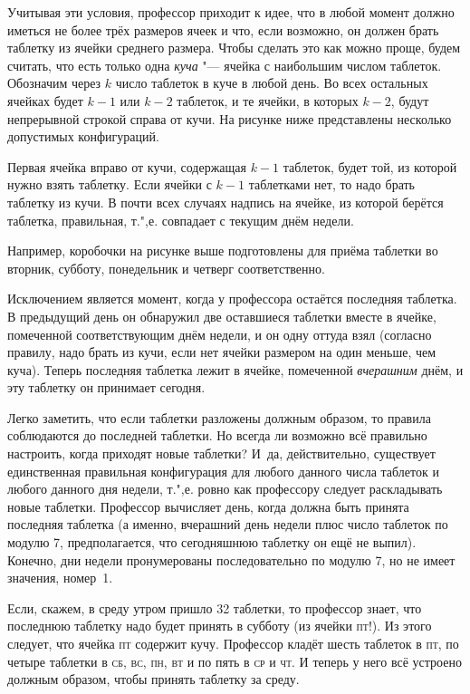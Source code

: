 \documentclass[twoside]{book}
\begin{document}
Учитывая эти условия, профессор приходит к идее, что в любой момент должно иметься не более трёх размеров ячеек и что, если возможно, он должен брать таблетку из ячейки среднего размера.
Чтобы сделать это как можно проще, будем считать, что есть только одна \emph{куча} "--- ячейка с наибольшим числом таблеток.
Обозначим через $k$ число таблеток в куче в любой день.
Во всех остальных ячейках будет $k-1$ или $k-2$ таблеток, и те ячейки, в которых $k-2$, будут непрерывной строкой справа от кучи.
На рисунке ниже представлены несколько допустимых конфигураций.

Первая ячейка вправо от кучи, содержащая $k-1$ таблеток, будет той, из которой нужно взять таблетку.
Если ячейки с $k-1$ таблетками нет, то надо брать таблетку из кучи.
В почти всех случаях надпись на ячейке, из которой берётся таблетка, правильная, т.",е. совпадает с текущим днём недели.

Например, коробочки на рисунке выше подготовлены для приёма таблетки во вторник, субботу, понедельник и четверг соответственно.

Исключением является момент, когда у профессора остаётся последняя таблетка.
В предыдущий день он обнаружил две оставшиеся таблетки вместе в ячейке, помеченной соответствующим днём недели, и он одну оттуда взял (согласно правилу, надо брать из кучи, если нет ячейки размером на один меньше, чем куча).
Теперь последняя таблетка лежит в ячейке, помеченной \emph{вчерашним} днём, и эту таблетку он принимает сегодня.

Легко заметить, что если таблетки разложены должным образом, то правила соблюдаются до последней таблетки.
Но всегда ли возможно всё правильно настроить, когда приходят новые таблетки?
И~да, действительно, существует единственная правильная конфигурация для любого данного числа таблеток и любого данного дня недели, т.",е. ровно как профессору следует раскладывать новые таблетки.
Профессор вычисляет день, когда должна быть принята последняя таблетка (а именно, вчерашний день недели плюс число таблеток по модулю 7, 
предполагается, что сегодняшнюю таблетку он ещё не выпил).
Конечно, дни недели пронумерованы последовательно  по модулю 7, но не имеет значения,  номер~1.

Если, скажем, в среду утром пришло 32 таблетки, то профессор знает, что последнюю таблетку надо будет принять в субботу (из ячейки \textsc{пт}!). Из этого следует, что ячейка \textsc{пт} содержит кучу.
Профессор кладёт шесть таблеток в \textsc{пт}, по четыре таблетки в \textsc{сб}, \textsc{вс}, \textsc{пн}, \textsc{вт} и по пять в \textsc{ср} и \textsc{чт}.
И теперь у него всё устроено должным образом, чтобы принять таблетку за среду.
\heart
\end{document}
